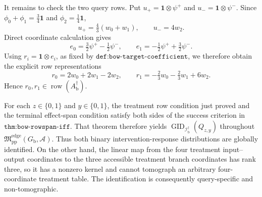 It remains to check the two query rows.  Put \(u_+=\mathbf 1\otimes\psi^+\) and \(u_-=\mathbf 1\otimes\psi^-\).  Since \(\phi_0+\phi_1=\tfrac34\mathbf 1\) and \(\phi_2=\tfrac14\mathbf 1\),
\[
 u_+=\tfrac43(w_0+w_1),
 \qquad
 u_-=4w_2.
\]
Direct coordinate calculation gives
\[
 e_0=\tfrac32\psi^+-\tfrac12\psi^- ,
 \qquad
 e_1=-\tfrac12\psi^++\tfrac32\psi^- .
\]
Using \(r_i=\mathbf 1\otimes e_i\), as fixed by \(\texttt{def:bow-target-coefficient}\), we therefore obtain the explicit row representations
\[
 r_0=2w_0+2w_1-2w_2,
 \qquad
 r_1=-\tfrac23w_0-\tfrac23w_1+6w_2.
\]
Hence \(r_0,r_1\in\operatorname{row}(A_{\mathrm b}^{\dagger})\).

For each \(z\in\{0,1\}\) and \(y\in\{0,1\}\), the treatment row condition just proved and the terminal effect-span condition satisfy both sides of the success criterion in \(\texttt{thm:bow-rowspan-iff}\).  That theorem therefore yields \(\operatorname{GID}_{\mathcal I_{\mathrm b}^{\dagger}}(Q_{z,y})\) throughout \(\mathfrak M_{\mathrm{pp}}^{\mathrm{edge}}(G_{\mathrm b},\mathcal A)\).  Thus both binary intervention-response distributions are globally identified.  On the other hand, the linear map from the four treatment input--output coordinates to the three accessible treatment branch coordinates has rank three, so it has a nonzero kernel and cannot tomograph an arbitrary four-coordinate treatment table.  The identification is consequently query-specific and non-tomographic.